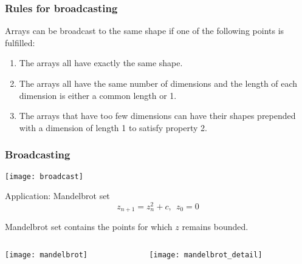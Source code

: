 \begin{frame}[fragile]
 \vspace{0.5truecm}
 \hspace*{-0.32truecm}{\small Many more special functions are provided as ufuncs by SciPy}
\end{frame}

\begin{frame}[fragile]\frametitle{Rules for broadcasting}
 Arrays can be broadcast to the same shape if one of the following points is
 fulfilled:
 \begin{enumerate}
  \item The arrays all have exactly the same shape.
  \item The arrays all have the same number of dimensions and the
        length of each dimension is either a common length or 1.
  \item The arrays that have too few dimensions can have their
        shapes prepended with a dimension of length 1 to satisfy
        property 2.
 \end{enumerate}
\end{frame}

\begin{frame}[fragile]\frametitle{Broadcasting}
 \texttt{[image: broadcast]}

\end{frame}

\begin{frame}{Application: Mandelbrot set}
 \begin{displaymath}
  z_{n+1} = z_n^2+c,\ \ z_0=0
 \end{displaymath}

 Mandelbrot set contains the points for which $z$ remains bounded.

 \begin{columns}
  \begin{column}{0.5\linewidth}
   \begin{center}
    \texttt{[image: mandelbrot]}

    \vspace{0.3truecm}
   \end{center}
  \end{column}%
  \begin{column}{0.5\linewidth}
   \begin{center}
    \texttt{[image: mandelbrot\_detail]}

    \vspace{2.35truecm}
   \end{center}
  \end{column}
 \end{columns}
\end{frame}

